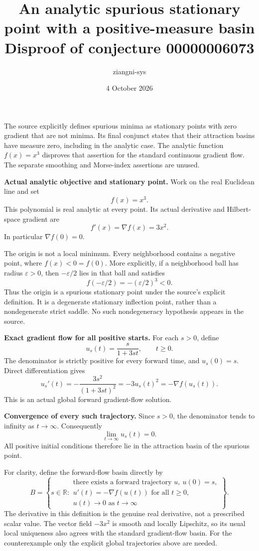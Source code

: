 \documentclass[11pt,a4paper]{article}
\title{An analytic spurious stationary point with a positive-measure basin\\
\large Disproof of conjecture 00000006073}
\author{ziangni-sys}
\date{4 October 2026}
\begin{document}
\maketitle
The source explicitly defines spurious minima as stationary
points with zero gradient that are not minima. Its final
conjunct states that their attraction basins have measure zero,
including in the analytic case.
The analytic function $f(x)=x^3$ disproves that assertion for
the standard continuous gradient flow.
The separate smoothing and Morse-index assertions are unused.

\textbf{Actual analytic objective and stationary point.}
Work on the real Euclidean line and set
\[
 f(x)=x^3.
\]
This polynomial is real analytic at every point. Its actual
derivative and Hilbert-space gradient are
\[
 f'(x)=\nabla f(x)=3x^2.
\]
In particular $\nabla f(0)=0$.

The origin is not a local minimum. Every neighborhood contains
a negative point, where $f(x)<0=f(0)$.
More explicitly, if a neighborhood ball has radius $\varepsilon>0$,
then $-\varepsilon/2$ lies in that ball and satisfies
\[
 f(-\varepsilon/2)=-(\varepsilon/2)^3<0.
\]
Thus the origin is a spurious stationary point under the
source's explicit definition.
It is a degenerate stationary inflection point, rather than a
nondegenerate strict saddle. No such nondegeneracy hypothesis
appears in the source.

\textbf{Exact gradient flow for all positive starts.}
For each $s>0$, define
\[
 u_s(t)=\frac{s}{1+3st},\qquad t\geq0 .
\]
The denominator is strictly positive for every forward time,
and $u_s(0)=s$. Direct differentiation gives
\[
 u_s'(t)=-\frac{3s^2}{(1+3st)^2}
        =-3u_s(t)^2=-\nabla f(u_s(t)).
\]
This is an actual global forward gradient-flow solution.

\newpage
\textbf{Convergence of every such trajectory.}
Since $s>0$, the denominator tends to infinity as $t\to\infty$.
Consequently
\[
 \lim_{t\to\infty}u_s(t)=0.
\]
All positive initial conditions therefore lie in the attraction
basin of the spurious point.

For clarity, define the forward-flow basin directly by
\[
 B=\left\{s\in\mathbb R:
 \begin{array}{l}
 \text{there exists a forward trajectory }u,\ u(0)=s,\\
 u'(t)=-\nabla f(u(t))\text{ for all }t\geq0,\\
 u(t)\longrightarrow0\text{ as }t\to\infty
 \end{array}\right\}.
\]
The derivative in this definition is the genuine real
derivative, not a prescribed scalar value. The vector field
$-3x^2$ is smooth and locally Lipschitz, so its usual local
uniqueness also agrees with the standard gradient-flow basin.
For the counterexample only the explicit global trajectories
above are needed.
\end{document}
